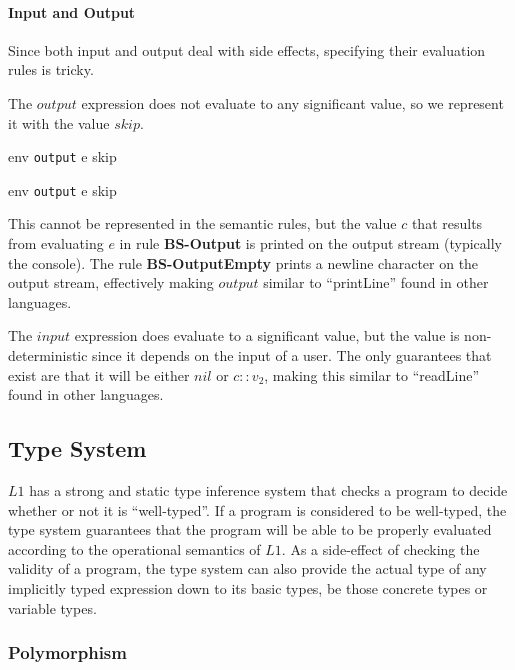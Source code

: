 \documentclass{article}
\begin{document}
\paragraph{Input and Output}
Since both input and output deal with side effects, specifying their evaluation rules is tricky.

The $output$ expression does not evaluate to any significant value, so we represent it with the value $skip$.

    {\mbox{env} \vdash \texttt{output} \; e \Downarrow skip}

    {\mbox{env} \vdash \texttt{output} \; e \Downarrow skip}

This cannot be represented in the semantic rules, but the value $c$ that results from evaluating $e$ in rule \textbf{BS-Output} is printed on the output stream (typically the console).
The rule \textbf{BS-OutputEmpty} prints a newline character on the output stream, effectively making $output$ similar to "`printLine"' found in other languages.

The $input$ expression does evaluate to a significant value, but the value is non-deterministic since it depends on the input of a user.
The only guarantees that exist are that it will be either $nil$ or $c :: v_2$, making this similar to "`readLine"' found in other languages.


\subsection{Type System}\label{Type System}

$L1$ has a strong and static type inference system that checks a program to decide whether or not it is "`well-typed"'.
If a program is considered to be well-typed, the type system guarantees that the program will be able to be properly evaluated according to the operational semantics of $L1$.
As a side-effect of checking the validity of a program, the type system can also provide the actual type of any implicitly typed expression down to its basic types, be those concrete types or variable types.

\subsubsection{Polymorphism}\label{Polymorphism}
\end{document}
